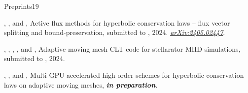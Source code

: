 %
\begin{cvpublicationsection}{Preprints}{19}
%
\item {}, , and , Active flux methods for hyperbolic conservation laws -- flux vector splitting and bound-preservation, submitted to , 2024. \href{https://arxiv.org/abs/2405.02447}{\em arXiv:2405.02447}.
%
\item {}, , , , and , Adaptive moving mesh CLT code for stellarator MHD simulations, submitted to , 2024.
%
\item {}, , and , Multi-GPU accelerated high-order schemes for hyperbolic conservation laws on adaptive moving meshes, {\em\bfseries in preparation}.
\end{cvpublicationsection}

